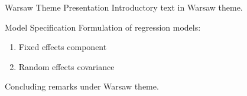 \documentclass[14pt,t]{beamer-accessibility}
\begin{document}
\begin{frame}{Warsaw Theme Presentation}
Introductory text in Warsaw theme.

\begin{block}{Model Specification}
Formulation of regression models:
\begin{enumerate}
\item Fixed effects component
\item Random effects covariance
\end{enumerate}
\end{block}

Concluding remarks under Warsaw theme.
\end{frame}
\end{document}
